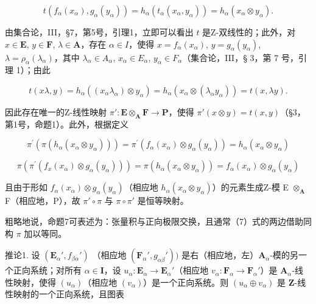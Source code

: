\[
t \left(f _ {\alpha} (x _ {\alpha}), g _ {\alpha} (y _ {\alpha})\right) = h _ {\alpha} \left(t _ {\alpha} \left(x _ {\alpha}, y _ {\alpha}\right)\right) = h _ {\alpha} \left(x _ {\alpha} \otimes y _ {\alpha}\right).
\]

由集合论，III，§7，第5号，引理1，立即可以看出 \(t\) 是Z-双线性的；此外，对 \(x \in \mathbf{E}\), \(y \in \mathbf{F}\), \(\lambda \in \mathbf{A}\)，存在 \(\alpha \in I\)，使得 \(x = f_{\alpha}(x_{\alpha})\), \(y = g_{\alpha}(y_{\alpha})\), \(\lambda = \rho_{\alpha}(\lambda_{\alpha})\)，其中 \(\lambda_{\alpha} \in A_{\alpha}\), \(x_{\alpha} \in E_{\alpha}\), \(y_{\alpha} \in F_{\alpha}\)（集合论，III，§ 3，第 7 号，引理 1）；由此

\[
t (x \lambda , y) = h _ {\alpha} ((x _ {\alpha} \lambda_ {\alpha}) \otimes y _ {\alpha}) = h _ {\alpha} (x _ {\alpha} \otimes (\lambda_ {\alpha} y _ {\alpha})) = t (x, \lambda y).
\]

因此存在唯一的Z-线性映射 \(\pi':\mathbf{E} \otimes_{\mathbf{A}} \mathbf{F} \to \mathbf{P}\)，使得 \(\pi'(x \otimes y) = t(x, y)\)（§3，第1号，命题1）。此外，根据定义

\[
\pi^ {\prime} \left(\pi \left(h _ {\alpha} \left(x _ {\alpha} \otimes y _ {\alpha}\right)\right)\right) = \pi^ {\prime} \left(f _ {\alpha} \left(x _ {\alpha}\right) \otimes g _ {\alpha} \left(y _ {\alpha}\right)\right) = h _ {\alpha} \left(x _ {\alpha} \otimes y _ {\alpha}\right)
\]

\[
\pi (\pi^ {\prime} (f _ {x} (x _ {\alpha}) \otimes g _ {\alpha} (y _ {\alpha}))) = \pi (h _ {\alpha} (x _ {\alpha} \otimes y _ {\alpha})) = f _ {\alpha} (x _ {\alpha}) \otimes g _ {\alpha} (y _ {\alpha})
\]

且由于形如 \(f_{\alpha}(x_{\alpha}) \otimes g_{\alpha}(y_{\alpha})\)（相应地 \(h_{\alpha}(x_{\alpha} \otimes y_{\alpha})\)）的元素生成Z-模 E \(\otimes_{\mathbf{A}}\) F（相应地，P），故 \(\pi' \circ \pi\) 与 \(\pi \circ \pi'\) 是恒等映射。

粗略地说，命题7可表述为：张量积与正向极限交换，且通常（7）式的两边借助同构 \(\pi\) 加以等同。

推论1. 设 \((\mathbf{E}_{\alpha}', f_{\beta \alpha}')\) （相应地 \((\mathbf{F}_{\alpha}', g_{\alpha \beta}'))\) 是右（相应地，左）\(\mathbf{A}_{\alpha}\)-模的另一个正向系统；对所有 \(\alpha \in \mathbf{I}\)，设 \(u_{\alpha}: \mathbf{E}_{\alpha} \to \mathbf{E}_{\alpha}'\)（相应地 \(v_{\alpha}: \mathbf{F}_{\alpha} \to \mathbf{F}_{\alpha}'\)）是 \(\mathbf{A}_{\alpha}\)-线性映射，使得 \((u_{\alpha})\)（相应地 \((v_{\alpha})\)）是一个正向系统。则 \((u_{\alpha} \oplus v_{\alpha})\) 是 \(\mathbf{Z}\)-线性映射的一个正向系统，且图表

